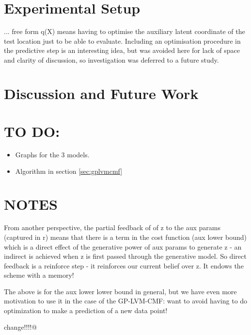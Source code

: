 \documentclass[]{article}
\begin{document}
\section{Experimental Setup}\label{sec:experiments}

... free form q(X) means having to optimise the auxiliary latent coordinate of the test location just to be able to evaluate.
Including an optimisation procedure in the predictive step is an interesting idea, but was avoided here for lack of space and clarity of discussion, so investigation was deferred to a future study.

\section{Discussion and Future Work}\label{sec:discussion}

\section{TO DO:}
\begin{itemize}
  \item Graphs for the 3 models.
  \item Algorithm in section \ref{sec:gplvmcmf}
\end{itemize}

\section{NOTES}

From another perspective, the partial feedback of of z to the aux params (captured in r) means that there is a term in the cost function (aux lower bound) which is a direct effect of the generative power of aux params to generate z - an indirect is achieved when z is first passed through the generative model. So direct feedback is a reinforce step - it reinforces our current belief over z.
It endows the scheme with a memory!

The above is for the aux lower lower bound in general, but we have even more motivation to use it in the case of the GP-LVM-CMF: want to avoid having to do optimization to make a prediction of a new data point!

change!!!!@

{}

\end{document}
